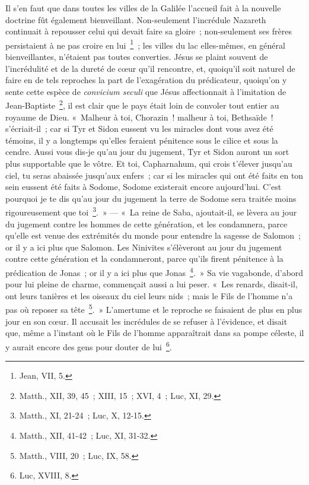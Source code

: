 \documentclass[french,twoside]{book} %
\begin{document}
Il s’en faut que dans toutes les villes de la Galilée l’accueil fait à la nouvelle doctrine fût également bienveillant. Non-seulement l’incrédule Nazareth continuait à repousser celui qui devait faire sa gloire ; non-seulement ses frères persistaient à ne pas croire en lui \footnote{Jean, VII, 5.} ; les villes du lac elles-mêmes, en général bienveillantes, n’étaient pas toutes converties. Jésus se plaint souvent de l’incrédulité et de la dureté de cœur qu’il rencontre, et, quoiqu’il soit naturel de faire en de tels reproches la part de l’exagération du prédicateur, quoiqu’on y sente cette espèce de {\itshape convicium seculi} que Jésus affectionnait à l’imitation de Jean-Baptiste \footnote{Matth., XII, 39, 45 ; XIII, 15 ; XVI, 4 ; Luc, XI, 29.}, il est clair que le pays était loin de convoler tout entier au royaume de Dieu. « Malheur à toi, Chorazin ! malheur à toi, Bethsaïde ! s’écriait-il ; car si Tyr et Sidon eussent vu les miracles dont vous avez été témoins, il y a longtemps qu’elles feraient pénitence sous le cilice et sous la cendre. Aussi vous dis-je qu’au jour du jugement, Tyr et Sidon auront un sort plus supportable que le vôtre. Et toi, Capharnahum, qui crois t’élever jusqu’au ciel, tu seras abaissée jusqu’aux enfers ; car si les miracles qui ont été faits en ton sein eussent été faits à Sodome, Sodome existerait encore aujourd’hui. C’est pourquoi je te dis qu’au jour du jugement la terre de Sodome sera traitée moins rigoureusement que toi \footnote{Matth., XI, 21-24 ; Luc, X, 12-15.}. » — « La reine de Saba, ajoutait-il, se lèvera au jour du jugement contre les hommes de cette génération, et les condamnera, parce qu’elle est venue des extrémités du monde pour entendre la sagesse de Salomon ; or il y a ici plus que Salomon. Les Ninivites s’élèveront au jour du jugement contre cette génération et la condamneront, parce qu’ils firent pénitence à la prédication de Jonas ; or il y a ici plus que Jonas \footnote{Matth., XII, 41-42 ; Luc, XI, 31-32.}. » Sa vie vagabonde, d’abord pour lui pleine de charme, commençait aussi a lui peser. « Les renards, disait-il, ont leurs tanières et les oiseaux du ciel leurs nids ; mais le Fils de l’homme n’a pas où reposer sa tête \footnote{Matth., VIII, 20 ; Luc, IX, 58.}. » L’amertume et le reproche se faisaient de plus en plus jour en son cœur. Il accusait les incrédules de se refuser à l’évidence, et disait que, même a l’instant où le Fils de l’homme apparaîtrait dans sa pompe céleste, il y aurait encore des gens pour douter de lui \footnote{Luc, XVIII, 8.}.\par
\end{document}
